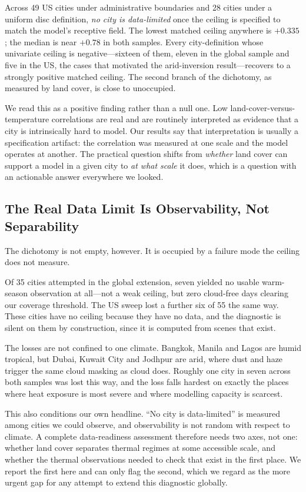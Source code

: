 \documentclass[remotesensing,article,submit,oneauthor]{Definitions/mdpi}
\begin{document}
Across 49 US cities under administrative boundaries and 28 cities under a
uniform disc definition, \emph{no city is data-limited} once the ceiling
is specified to match the model's receptive field. The lowest matched
ceiling anywhere is $+0.335$; the median is near $+0.78$ in both samples.
Every city-definition whose univariate ceiling is negative---sixteen of
them, eleven in the global sample and five in the US, the cases that
motivated the arid-inversion result---recovers to a strongly positive
matched ceiling. The second branch of the dichotomy, as measured by land
cover, is close to unoccupied.

We read this as a positive finding rather than a null one. Low
land-cover-versus-temperature correlations are real and are routinely
interpreted as evidence that a city is intrinsically hard to model. Our
results say that interpretation is usually a specification artifact: the
correlation was measured at one scale and the model operates at another.
The practical question shifts from \emph{whether} land cover can support a
model in a given city to \emph{at what scale} it does, which is a question
with an actionable answer everywhere we looked.

\subsection{The Real Data Limit Is Observability, Not Separability}

The dichotomy is not empty, however. It is occupied by a failure mode the
ceiling does not measure.

Of 35 cities attempted in the global extension, seven yielded no usable
warm-season observation at all---not a weak ceiling, but zero cloud-free
days clearing our coverage threshold. The US sweep lost a further six of
55 the same way. These cities have no ceiling because they have no data,
and the diagnostic is silent on them by construction, since it is computed
from scenes that exist.

The losses are not confined to one climate. Bangkok, Manila and Lagos are
humid tropical, but Dubai, Kuwait City and Jodhpur are arid, where dust
and haze trigger the same cloud masking as cloud does. Roughly one city in
seven across both samples was lost this way, and the loss falls hardest on
exactly the places where heat exposure is most severe and where modelling
capacity is scarcest.

This also conditions our own headline. ``No city is data-limited'' is
measured among cities we could observe, and observability is not random
with respect to climate. A complete data-readiness assessment therefore
needs two axes, not one: whether land cover separates thermal regimes at
some accessible scale, and whether the thermal observations needed to
check that exist in the first place. We report the first here and can only
flag the second, which we regard as the more urgent gap for any attempt to
extend this diagnostic globally.
\end{document}
